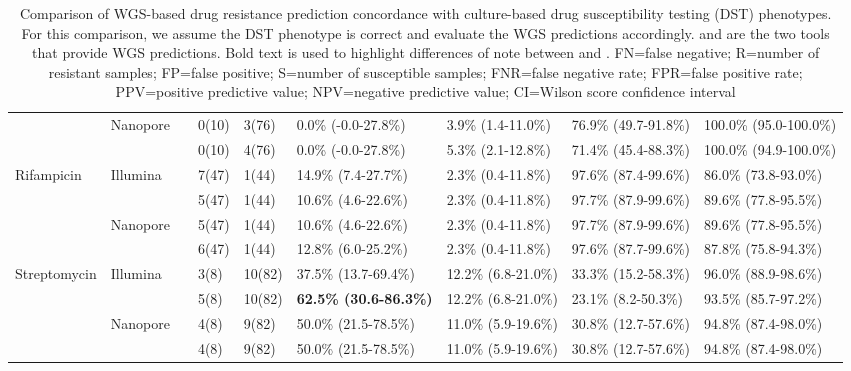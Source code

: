 \begin{table}
{\begin{tabular}{@{}lllllllll@{}}
     & \multirow{2}{*}{Nanopore} & \drprg{}   & 0(10) & 3(76)  & 0.0\% (-0.0-27.8\%)           & 3.9\% (1.4-11.0\%)   & 76.9\% (49.7-91.8\%) & 100.0\% (95.0-100.0\%) \\
     &                           & \mykrobe{} & 0(10) & 4(76)  & 0.0\% (-0.0-27.8\%)           & 5.3\% (2.1-12.8\%)   & 71.4\% (45.4-88.3\%) & 100.0\% (94.9-100.0\%) \\ \cmidrule(l){3-9} 
\multirow{4}{*}{Rifampicin} &
  \multirow{2}{*}{Illumina} &
  \drprg{} &
  7(47) &
  1(44) &
  14.9\% (7.4-27.7\%) &
  2.3\% (0.4-11.8\%) &
  97.6\% (87.4-99.6\%) &
  86.0\% (73.8-93.0\%) \\
     &                           & \mykrobe{} & 5(47) & 1(44)  & 10.6\% (4.6-22.6\%)           & 2.3\% (0.4-11.8\%)   & 97.7\% (87.9-99.6\%) & 89.6\% (77.8-95.5\%)   \\
     & \multirow{2}{*}{Nanopore} & \drprg{}   & 5(47) & 1(44)  & 10.6\% (4.6-22.6\%)           & 2.3\% (0.4-11.8\%)   & 97.7\% (87.9-99.6\%) & 89.6\% (77.8-95.5\%)   \\
     &                           & \mykrobe{} & 6(47) & 1(44)  & 12.8\% (6.0-25.2\%)           & 2.3\% (0.4-11.8\%)   & 97.6\% (87.7-99.6\%) & 87.8\% (75.8-94.3\%)   \\ \cmidrule(l){3-9} 
\multirow{4}{*}{Streptomycin} &
  \multirow{2}{*}{Illumina} &
  \drprg{} &
  3(8) &
  10(82) &
  37.5\% (13.7-69.4\%) &
  12.2\% (6.8-21.0\%) &
  33.3\% (15.2-58.3\%) &
  96.0\% (88.9-98.6\%) \\
     &                           & \mykrobe{} & 5(8)  & 10(82) & \textbf{62.5\% (30.6-86.3\%)} & 12.2\% (6.8-21.0\%)  & 23.1\% (8.2-50.3\%)  & 93.5\% (85.7-97.2\%)   \\
     & \multirow{2}{*}{Nanopore} & \drprg{}   & 4(8)  & 9(82)  & 50.0\% (21.5-78.5\%)          & 11.0\% (5.9-19.6\%)  & 30.8\% (12.7-57.6\%) & 94.8\% (87.4-98.0\%)   \\
     &                           & \mykrobe{} & 4(8)  & 9(82)  & 50.0\% (21.5-78.5\%)          & 11.0\% (5.9-19.6\%)  & 30.8\% (12.7-57.6\%) & 94.8\% (87.4-98.0\%)   \\ \cmidrule(l){3-9} 
\end{tabular}%
}
\caption{Comparison of WGS-based drug resistance prediction concordance with culture-based drug susceptibility testing (DST) phenotypes. For this comparison, we assume the DST phenotype is correct and evaluate the WGS predictions accordingly. \drprg{} and \mykrobe{} are the two tools that provide WGS predictions. Bold text is used to highlight differences of note between \drprg{} and \mykrobe{}. FN=false negative; R=number of resistant samples; FP=false positive; S=number of susceptible samples; FNR=false negative rate; FPR=false positive rate; PPV=positive predictive value; NPV=negative predictive value; CI=Wilson score confidence interval}
\label{tab:pheno-concordance}
\end{table}

